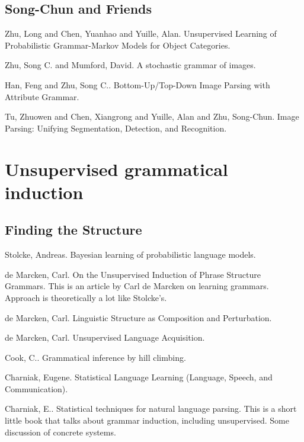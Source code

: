\documentclass{article}
\begin{document}
\subsection{ Song-Chun and Friends} 

\bitem
\item Zhu, Long and Chen, Yuanhao and Yuille, Alan. Unsupervised Learning of Probabilistic Grammar-Markov Models for Object Categories. \cite{Zhu2009Unsupervised} \item Zhu, Song C. and Mumford, David. A stochastic grammar of images. \cite{Zhu2006Stochastic} \item Han, Feng and Zhu, Song C.. Bottom-Up/Top-Down Image Parsing with Attribute Grammar. \cite{Han2009BottomUpTopDown} \item Tu, Zhuowen and Chen, Xiangrong and Yuille, Alan and Zhu, Song-Chun. Image Parsing: Unifying Segmentation, Detection, and Recognition. \cite{Tu2005Image} 
\eitem

\section{ Unsupervised grammatical induction} 
\subsection{ Finding the Structure} 

\bitem
\item Stolcke, Andreas. Bayesian learning of probabilistic language models. \cite{Stolcke1994Bayesian} \item de Marcken, Carl. On the Unsupervised Induction of Phrase Structure Grammars. \cite{deMarcken1995Unsupervised} 
This is an article by Carl de Marcken on learning grammars. Approach
is theoretically a lot like Stolcke's.

\item de Marcken, Carl. Linguistic Structure as Composition and Perturbation. \cite{deMarcken1996Linguistic} 
\item de Marcken, Carl. Unsupervised Language Acquisition. \cite{deMarcken1996Unsupervised} 
\item Cook, C.. Grammatical inference by hill climbing. \cite{Cook1976Grammatical} 
\item Charniak, Eugene. Statistical Language Learning (Language, Speech, and Communication). \cite{Charniak1996Statistical} 
\item Charniak, E.. Statistical techniques for natural language parsing. \cite{Charniak97a} 
This is a short little book that talks about grammar induction,
including unsupervised. Some discussion of concrete systems.
\end{document}
